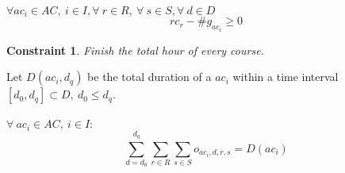 \documentclass[12pt,a4paper]{article}
\newtheorem{theorem}{Constraint}
\begin{document}
$
\forall ac_i \in AC, \ i \in I, \forall \ r \in R, \ \forall \ s \in S, \forall \ d \in D 
$
\begin{equation}
rc_r - \#g_{ac_{i}} \geq 0
\end{equation}

\begin{theorem}
Finish the total hour of every course.
\end{theorem}
Let $D(ac_i, d_q)$ be the total duration of a $ac_i$ within a time interval $\left[d_0, d_q\right] \subset D, \ d_0 \leq d_q$. \\ \\
$
\forall \ ac_{i} \in AC, \ i \in I :
$ \\
\begin{equation}
\sum_{d = d_0 }^{d_q}\sum_{r \in R}\sum_{s \in S} {o_{ac_{i}, d, r, s}} = D(ac_{i})
\end{equation}
\end{document}
